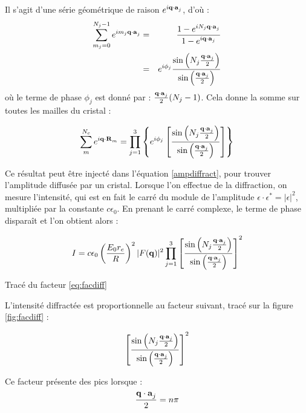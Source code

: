 Il s'agit d'une série géométrique de raison $e^{i \mathbf{q\cdot a}_j}$, d'où :
\begin{eqnarray}
    \sum_{m_j = 0}^{N_j - 1} e^{i m_j \mathbf{q\cdot a}_j} & = &
    \frac{1 - e^{i N_j \mathbf{q\cdot a}_j}}{1 - e^{i \mathbf{q \cdot a}_j}} \\
    & = & e^{i \phi_j} \frac{\sin \left( N_j \frac{\mathbf{q\cdot a}_j}{2} \right) }{\sin \left( \frac{\mathbf{q\cdot a}_j}{2} \right)}
\end{eqnarray}
où le terme de phase $\phi_j$ est donné par : $\frac{\mathbf{q\cdot a}_j}{2} (N_j
-1)$. Cela donne la somme sur toutes les mailles du cristal :

\begin{equation}
    \sum_m^{N_c} e^{i\mathbf{q\cdot R}_m} = \prod_{j=1}^3 \left\{ e^{i\phi_j} \left[ \frac{\sin \left(N_j \frac{\mathbf{q\cdot a}_j}{2}
    \right)}{\sin \left(\frac{\mathbf{q\cdot a}_j}{2} \right)} \right] \right\}
    \label{sommecristal}
\end{equation}

Ce résultat peut être injecté dans l'équation \ref{ampdiffract}, pour trouver
l'amplitude diffusée par un cristal. Lorsque l'on effectue de la diffraction, on
mesure l'intensité, qui est en fait le carré du module de l'amplitude
$\epsilon \cdot \epsilon^* = |\epsilon|^2$, multipliée par la constante
$c\epsilon_0$. En prenant le carré complexe, le terme de phase disparaît et l'on
obtient alors :

\begin{equation}
    I = c\epsilon_0 \left( \frac{E_0 r_e}{R} \right)^2 |F(\mathbf{q})|^2
    \prod_{j=1}^3 \left[ \frac{\sin \left(N_j \frac{\mathbf{q\cdot a}_j}{2} \right)}{\sin \left( \frac{\mathbf{q\cdot a}_j}{2}\right)} \right]^2
\end{equation}

\begin{marginfigure}
    \TODO
    \caption{Tracé du facteur \ref{eq:facdiff}}
    \label{fig:facdiff}
\end{marginfigure}

L'intensité diffractée est proportionnelle au facteur suivant, tracé sur la figure \ref{fig:facdiff} :

\begin{equation}
    \left[ \frac{\sin \left(N_j \frac{\mathbf{q\cdot a}_j}{2} \right)}{\sin \left( \frac{\mathbf{q\cdot a}_j}{2}\right)} \right]^2
    \label{eq:facdiff}
\end{equation}

Ce facteur présente des pics lorsque :
\begin{equation}
    \frac{\mathbf{q \cdot a}_j}{2} = n \pi
\end{equation}

